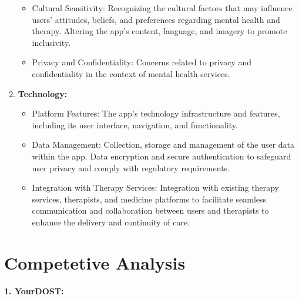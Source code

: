\documentclass[manuscript,screen,review]{acmart}
\begin{document}
\begin{enumerate}
\begin{itemize}
        \item Cultural Sensitivity: Recognizing the cultural factors that may influence users' attitudes, beliefs, and preferences regarding mental health and therapy. Altering the app's content, language, and imagery to promote inclusivity.
        \item Privacy and Confidentiality: Concerns related to privacy and confidentiality in the context of mental health services.
    \end{itemize}
    \item \textbf{Technology:}
    \begin{itemize}
        \item Platform Features: The app's technology infrastructure and features, including its user interface, navigation, and functionality. 

        \item Data Management: Collection, storage and management of the user data within the app. Data encryption and secure authentication to safeguard user privacy and comply with regulatory requirements.
        \item Integration with Therapy Services: Integration with existing therapy services, therapists, and medicine platforms to facilitate seamless communication and collaboration between users and therapists to enhance the delivery and continuity of care.
    \end{itemize}
\end{enumerate}


\section{Competetive Analysis}


\textbf{1. YourDOST:}
\end{document}
